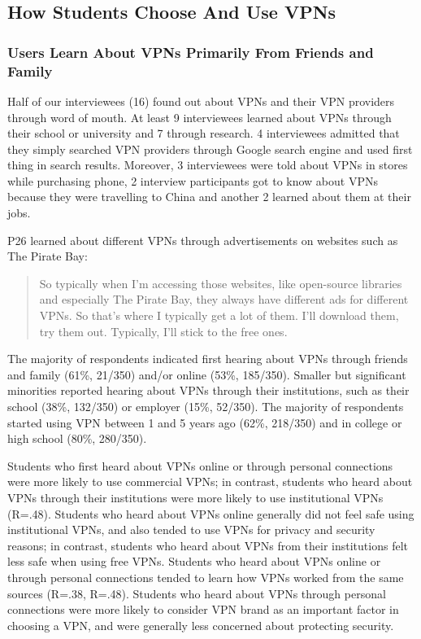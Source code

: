 \subsection{How Students Choose And Use VPNs }


\subsubsection{Users Learn About VPNs Primarily From Friends and Family} Half of our interviewees (16) found out about
VPNs and their VPN providers through word of mouth. At
least 9 interviewees learned about VPNs through their school or university and
7 through research. 4 interviewees admitted that they simply searched VPN
providers through Google search engine and used first thing in
search results. Moreover, 3 interviewees were told about VPNs in stores while
purchasing phone, 2 interview participants got to know about VPNs because they
were travelling to China and another 2 learned about them at their jobs.


P26 learned about different VPNs through advertisements on websites such as
The Pirate Bay: \begin{quote}So typically when I'm accessing those websites,
    like open-source libraries and especially The Pirate Bay, they always have
    different ads for different VPNs. So that's where I typically get a lot of
    them. I'll download them, try them out. Typically, I'll stick to the free
    ones.\end{quote}

The majority of respondents indicated first hearing about VPNs through friends
and family (61\%, 21/350) and/or online (53\%, 185/350). Smaller but
significant minorities reported hearing about VPNs through their institutions,
such as their school (38\%, 132/350) or employer (15\%, 52/350). The majority
of respondents started using VPN between 1 and 5 years ago (62\%, 218/350) and
in college or high school (80\%, 280/350).

Students who first heard about VPNs online or through personal connections
were more likely to use commercial VPNs; in contrast, students who heard about
VPNs through their institutions were more likely to use institutional VPNs
(R=.48). Students who heard about VPNs online generally did not feel safe
using institutional VPNs, and also tended to use VPNs for privacy and security
reasons; in contrast, students who heard about VPNs from their institutions
felt less safe when using free VPNs. Students who heard about VPNs online or
through personal connections tended to learn how VPNs worked from the same
sources (R=.38, R=.48). Students who heard about VPNs through personal
connections were more likely to consider VPN brand as an important factor in
choosing a VPN, and were generally less concerned about protecting security. 

